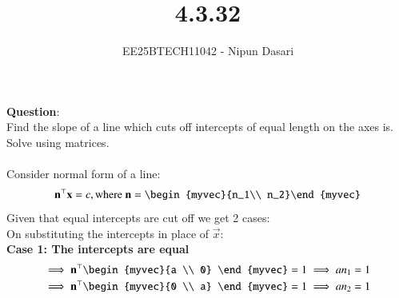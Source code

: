 \documentclass[journal]{IEEEtran}
\begin{document}
	
	
	\vspace{3cm}
	
	\title{4.3.32}
	\author{EE25BTECH11042 - Nipun Dasari}
	\maketitle
		
	\renewcommand{\thefigure}{\theenumi}
	\renewcommand{\thetable}{\theenumi}
	\setlength{\intextsep}{10pt} %
	
	
	\renewcommand{\thetable}{\theenumi}
	
	\textbf{Question}:\\
	Find the slope of a line which cuts off intercepts of equal length on the axes is. Solve using matrices. \\ 
	\solution \\
	
	Consider normal form of a line:
	\begin{align}
		\vec{n}^\top\vec{x} = c, \text{where } \vec{n} = \begin{myvec}{n_1\\ n_2}\end{myvec}
	\end{align}
	Given that equal intercepts are cut off we get 2 cases:\\
	On substituting the intercepts in place of $\vec{x}$: \\
	\textbf{Case 1: The intercepts are equal }
	\begin{align}
		\implies  \vec{n}^\top\begin{myvec}{a \\ 0} \end{myvec} = 1 \implies an_1 = 1 \label{0.2}\\
		\implies \vec{n}^\top\begin{myvec}{0 \\ a} \end{myvec} = 1 \implies an_2 = 1 \label{0.3} \\
	\end{align}
	
\end{document}
